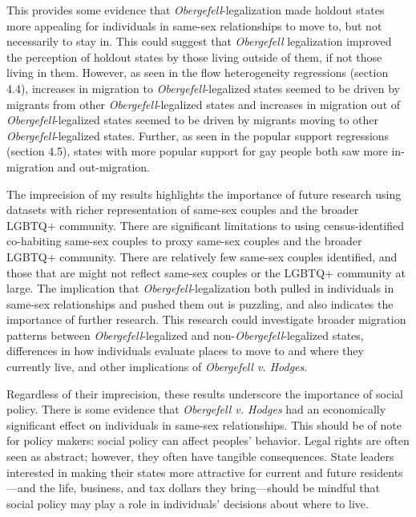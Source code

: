 \documentclass[12pt,letterpaper]{article}
\begin{document}
This provides some evidence that \textit{Obergefell}-legalization made holdout states more appealing for individuals in same-sex relationships to move to, but not necessarily to stay in. This could suggest that \textit{Obergefell} legalization improved the perception of holdout states by those living outside of them, if not those living in them. However, as seen in the flow heterogeneity regressions (section 4.4), increases in migration to \textit{Obergefell}-legalized states seemed to be driven by migrants from other \textit{Obergefell}-legalized states and increases in migration out of \textit{Obergefell}-legalized states seemed to be driven by migrants moving to other \textit{Obergefell}-legalized states. Further, as seen in the popular support regressions (section 4.5), states with more popular support for gay people both saw more in-migration and out-migration.

The imprecision of my results highlights the importance of future research using datasets with richer representation of same-sex couples and the broader LGBTQ+ community. There are significant limitations to using census-identified co-habiting same-sex couples to proxy same-sex couples and the broader LGBTQ+ community. There are relatively few same-sex couples identified, and those that are might not reflect same-sex couples or the LGBTQ+ community at large. The implication that \textit{Obergefell}-legalization both pulled in individuals in same-sex relationships and pushed them out is puzzling, and also indicates the importance of further research. This research could investigate broader migration patterns between \textit{Obergefell}-legalized and non-\textit{Obergefell}-legalized states, differences in how individuals evaluate places to move to and where they currently live, and other implications of \textit{Obergefell v. Hodges}. 

Regardless of their imprecision, these results underscore the importance of social policy. There is some evidence that \textit{Obergefell v. Hodges} had an economically significant effect on individuals in same-sex relationships. This should be of note for policy makers: social policy can affect peoples' behavior. Legal rights are often seen as abstract; however, they often have tangible consequences. State leaders interested in making their states more attractive for current and future residents---and the life, business, and tax dollars they bring---should be mindful that social policy may play a role in individuals' decisions about where to live. 
\end{document}
